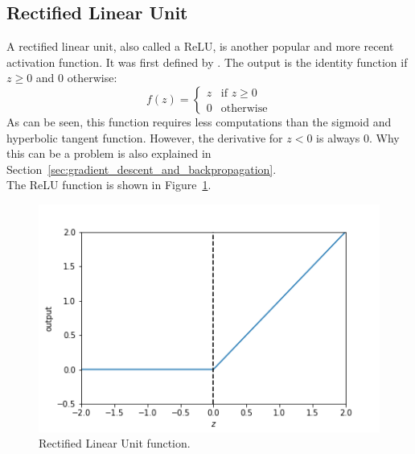\subsection{Rectified Linear Unit} %
\label{ssub:rectified_linear_unit}
A rectified linear unit, also called a ReLU, is another popular and more recent activation function. It was first defined by \cite{conf/icml/NairH10}. The output is the identity function if $z \ge 0$ and $0$ otherwise:
\begin{equation}
    f(z) = \begin{cases}
        z & \text{if $z \ge 0$}\\
        0 & \text{otherwise}
        \end{cases}
\end{equation}
As can be seen, this function requires less computations than the sigmoid and hyperbolic tangent function. However, the derivative for $z<0$ is always $0$. Why this can be a problem is also explained in Section~\ref{sec:gradient_descent_and_backpropagation}.\\
The ReLU function is shown in Figure~\ref{fig:relu}.
\begin{figure}[htb]
    \centering
    \includegraphics[width=.8\linewidth]{images/activation_functions/relu.png}
    \caption[Rectified Linear Unit function]{Rectified Linear Unit function.}
    \label{fig:relu}
\end{figure}

